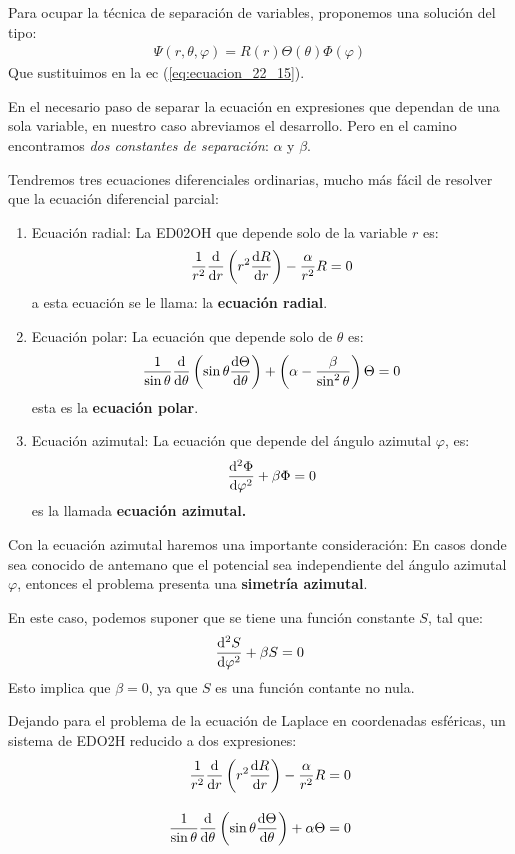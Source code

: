 Para ocupar la técnica de separación de variables, proponemos una solución del tipo:
\begin{align*}
\Psi(r, \theta, \varphi) = R(r) \Theta (\theta) \Phi(\varphi)
\end{align*}
Que sustituimos en la ec (\ref{eq:ecuacion_22_15}).
\par
En el necesario paso de separar la ecuación en expresiones que dependan de una sola variable, en nuestro caso abreviamos el desarrollo. Pero en el camino encontramos \emph{dos constantes de separación}: $\alpha$ y $\beta$.
\par
Tendremos tres ecuaciones diferenciales ordinarias, mucho más fácil de resolver que la ecuación diferencial parcial:
\begin{enumerate}
\item Ecuación radial: La ED02OH que depende solo de la variable $r$ es:
\begin{align}
\dfrac{1}{r^{2}} \dv{r} \left( r^{2} \dv{R}{r} \right) - \dfrac{\alpha}{r^{2}} R = 0
\label{eq:ecuacion_26_1a}
\end{align}
a esta ecuación se le llama: la \textbf{ecuación radial}.
\item Ecuación polar: La ecuación que depende solo de $\theta$ es:
\begin{align}
\dfrac{1}{\sin \theta} \dv{\theta} \left( \sin \theta \dv{\Theta}{\theta} \right) + \left( \alpha - \dfrac{\beta}{\sin^{2} \theta} \right) \Theta = 0
\label{eq:ecuacion_26_1b}
\end{align}
esta es la \textbf{ecuación polar}.
\item Ecuación azimutal: La ecuación que depende del ángulo azimutal $\varphi$, es:
\begin{align}
\dv[2]{\Phi}{\varphi} + \beta \Phi = 0
\label{eq:ecuacion_26_1c}
\end{align}
es la llamada \textbf{ecuación azimutal.}
\end{enumerate}

Con la ecuación azimutal haremos una importante consideración: En casos donde sea conocido de antemano que el potencial sea independiente del ángulo azimutal $\varphi$, entonces el problema presenta una \textbf{simetría azimutal}.
\par
En este caso, podemos suponer que se tiene una función constante $S$, tal que:
\begin{align*}
\dv[2]{S}{\varphi} + \beta S = 0
\end{align*}
Esto implica que $\beta = 0$, ya que $S$ es una función contante no nula.
\par
Dejando para el problema de la ecuación de Laplace en coordenadas esféricas, un sistema de EDO2H reducido a dos expresiones:
\begin{align}
\begin{aligned}
\dfrac{1}{r^{2}} \dv{r} \left( r^{2} \dv{R}{r} \right) - \dfrac{\alpha}{r^{2}} R &= 0 \\[1em]
\dfrac{1}{\sin \theta} \dv{\theta} \left( \sin \theta \dv{\Theta}{\theta} \right) + \alpha \Theta &= 0
\end{aligned}
\label{eq:ecuacion_26_02}
\end{align}

